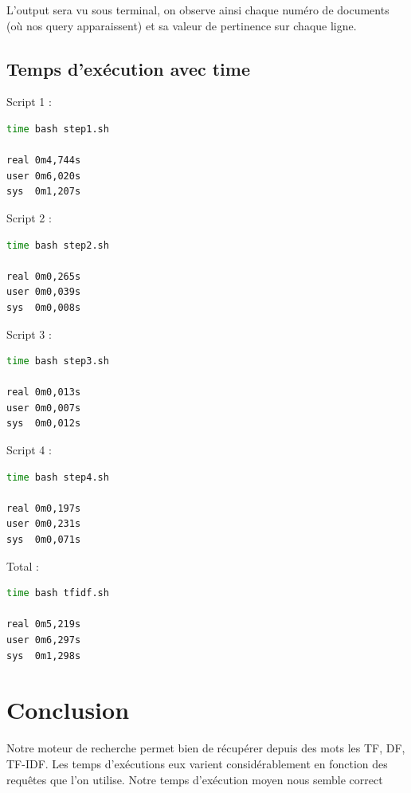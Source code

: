 \documentclass{article}
\begin{document}
L'output sera vu sous terminal, on observe ainsi chaque numéro de documents (où nos query apparaissent) et sa valeur de pertinence sur chaque ligne.

\subsection{Temps d'exécution avec time}

Script 1 :

\begin{lstlisting}[language=bash,caption={Temps d'exécution du script 1}]
time bash step1.sh

real 0m4,744s
user 0m6,020s
sys  0m1,207s

\end{lstlisting}

Script 2 :

\begin{lstlisting}[language=bash,caption={Temps d'exécution du script 2}]
time bash step2.sh

real 0m0,265s
user 0m0,039s
sys  0m0,008s

\end{lstlisting}

Script 3 :

\begin{lstlisting}[language=bash,caption={Temps d'exécution du script 3}]
time bash step3.sh

real 0m0,013s
user 0m0,007s
sys  0m0,012s
\end{lstlisting}

Script 4 :

\begin{lstlisting}[language=bash,caption={Temps d'exécution du script 4}]
time bash step4.sh

real 0m0,197s
user 0m0,231s
sys  0m0,071s

\end{lstlisting}

Total :

\begin{lstlisting}[language=bash,caption={Temps d'exécution en tout}]
time bash tfidf.sh

real 0m5,219s
user 0m6,297s
sys  0m1,298s

\end{lstlisting}

\section{Conclusion}

Notre moteur de recherche permet bien de récupérer depuis des mots les TF, DF, TF-IDF. Les temps d'exécutions eux varient considérablement en fonction des requêtes que l'on utilise. Notre temps d'exécution moyen nous semble correct
\end{document}
